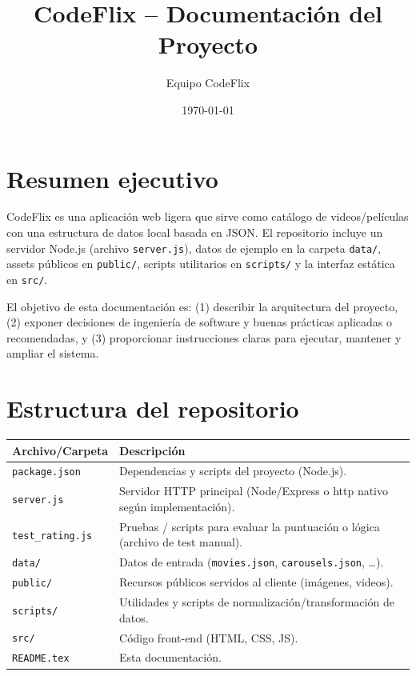 \documentclass[11pt,a4paper]{article}
\title{CodeFlix -- Documentación del Proyecto}
\author{Equipo CodeFlix}
\date{\today}
\begin{document}
\maketitle
\vspace{-1em}
\tableofcontents
\vspace{1em}

\section{Resumen ejecutivo}
CodeFlix es una aplicación web ligera que sirve como catálogo de videos/películas con una estructura de datos local basada en JSON. El repositorio incluye un servidor Node.js (archivo \texttt{server.js}), datos de ejemplo en la carpeta \texttt{data/}, assets públicos en \texttt{public/}, scripts utilitarios en \texttt{scripts/} y la interfaz estática en \texttt{src/}.

El objetivo de esta documentación es: (1) describir la arquitectura del proyecto, (2) exponer decisiones de ingeniería de software y buenas prácticas aplicadas o recomendadas, y (3) proporcionar instrucciones claras para ejecutar, mantener y ampliar el sistema.

\section{Estructura del repositorio}
\begin{longtable}{p{4cm} p{10cm}}
\textbf{Archivo/Carpeta} & \textbf{Descripción} \\\hline
\texttt{package.json} & Dependencias y scripts del proyecto (Node.js). \\
\texttt{server.js} & Servidor HTTP principal (Node/Express o http nativo según implementación). \\
\texttt{test_rating.js} & Pruebas / scripts para evaluar la puntuación o lógica (archivo de test manual). \\
\texttt{data/} & Datos de entrada (\texttt{movies.json}, \texttt{carousels.json}, \ldots). \\
\texttt{public/} & Recursos públicos servidos al cliente (imágenes, videos). \\
\texttt{scripts/} & Utilidades y scripts de normalización/transformación de datos. \\
\texttt{src/} & Código front-end (HTML, CSS, JS). \\
\texttt{README.tex} & Esta documentación. \\
\end{longtable}
\end{document}
